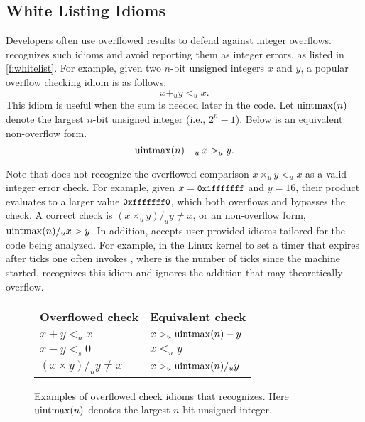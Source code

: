 \subsection{White Listing Idioms}
\label{s:sema:whitelist}

Developers often use overflowed results to defend against integer
overflows.  \sys recognizes such idioms and avoid reporting them
as integer errors, as listed in \autoref{f:whitelist}.  For example,
given two $n$-bit unsigned integers $x$ and $y$, a popular overflow
checking idiom is as follows:
\begin{equation*}
x +_u y <_u x.
\end{equation*}
This idiom is useful when the sum is needed later in the code.
Let $\operatorname{uintmax}(n)$ denote the largest $n$-bit unsigned integer (i.e.,
$2^n - 1$).  Below is an equivalent non-overflow form.
\begin{equation*}
\operatorname{uintmax}(n) -_u x >_u y.
\end{equation*}

Note that \sys does not recognize the overflowed comparison $x
\times_u y <_u x$ as a valid integer error check.  For example,
given $x = \cc{0x1fffffff}$ and $y = 16$, their product evaluates
to a larger value $\cc{0xfffffff0}$, which both overflows and
bypasses the check.  A correct check is $(x \times_u y) /_u y \neq
x$, or an non-overflow form, $\operatorname{uintmax}(n) /_u x > y$.
In addition, \sys accepts user-provided idioms tailored for the
code being analyzed.  For example, in the Linux kernel to set a
timer that expires after  ticks one often invokes
, where  is the
number of ticks since the machine started.  \sys recognizes
this idiom and ignores the addition  that may
theoretically overflow.
\fi

\begin{figure}
\centering
\begin{tabular}{ll}
\toprule
Overflowed check & Equivalent check \\ \midrule
$x + y <_u x$ & $x >_u \operatorname{uintmax}(n) - y$ \\
$x - y <_s 0$ & $x <_u y$ \\
$(x \times y) /_u y \neq x$ & $x >_u \operatorname{uintmax}(n) /_u y$   \\
\bottomrule
\end{tabular}
\caption{Examples of overflowed check idioms that \sys recognizes.
Here $\operatorname{uintmax}(n)$ denotes the largest $n$-bit unsigned integer.}
\label{f:whitelist}
\end{figure}
